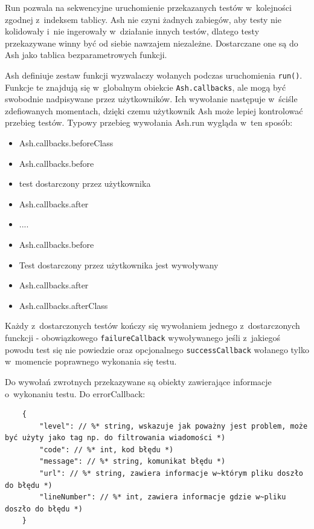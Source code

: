 \documentclass[brudnopis]{xmgr}
\begin{document}
Run pozwala na sekwencyjne uruchomienie przekazanych testów w~kolejności zgodnej z~indeksem tablicy. Ash nie czyni żadnych zabiegów, aby testy nie kolidowały i~nie ingerowały w~działanie innych testów, dlatego testy przekazywane winny być od siebie nawzajem niezależne. Dostarczane one są do Ash jako tablica bezparametrowych funkcji.

Ash definiuje zestaw funkcji wyzwalaczy wołanych podczas uruchomienia \texttt{run()}. Funkcje te znajdują się w~globalnym obiekcie \texttt{Ash.callbacks}, ale mogą być swobodnie nadpisywane przez użytkowników. Ich wywołanie następuje w~ściśle zdefiowanych momentach, dzięki czemu użytkownik Ash może lepiej kontrolować przebieg testów. Typowy przebieg wywołania Ash.run wygląda w~ten sposób:

\begin{itemize}
  \item Ash.callbacks.beforeClass
  \item Ash.callbacks.before
  \item {test dostarczony przez użytkownika}
  \item Ash.callbacks.after
  \item ....
  \item Ash.callbacks.before
  \item Test dostarczony przez użytkownika jest wywoływany
  \item Ash.callbacks.after
  \item Ash.callbacks.afterClass
\end{itemize}

Każdy z~dostarczonych testów kończy się wywołaniem jednego z~dostarczonych funckcji - obowiązkowego \texttt{failureCallback} wywoływanego jeśli z~jakiegoś powodu test się nie powiedzie oraz opcjonalnego \texttt{successCallback} wołanego tylko w~momencie poprawnego wykonania się testu.

Do wywołań zwrotnych przekazywane są obiekty zawierające informacje o~wykonaniu testu. Do errorCallback:

\begin{lstlisting}
	{
		"level": // %* string, wskazuje jak poważny jest problem, może być użyty jako tag np. do filtrowania wiadomości *)
		"code": // %* int, kod błędu *)
		"message": // %* string, komunikat błędu *) 
		"url": // %* string, zawiera informacje w~którym pliku doszło do błędu *)
		"lineNumber": // %* int, zawiera informacje gdzie w~pliku doszło do błędu *)
	}
\end{lstlisting}
\end{document}
